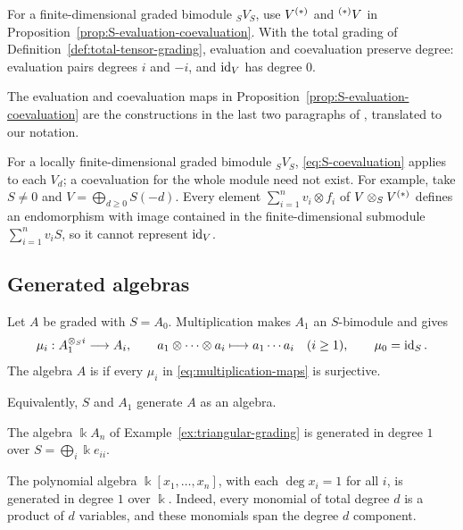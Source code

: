 \begin{advanced}
For a finite-dimensional graded bimodule $ {}_SV_S$, use $V^{(*)}$ and $ {}^{(*)}V$ in Proposition~\ref{prop:S-evaluation-coevaluation}.
With the total grading of Definition~\ref{def:total-tensor-grading}, evaluation and coevaluation preserve degree: evaluation pairs degrees $i$ and $-i$, and $\operatorname{id}_V$ has degree $0$.

The evaluation and coevaluation maps in Proposition~\ref{prop:S-evaluation-coevaluation} are the constructions in the last two paragraphs of \cite[\S2.7, pp.~484--485]{BGS96}, translated to our notation.

For a locally finite-dimensional graded bimodule $ {}_SV_S$, \eqref{eq:S-coevaluation} applies to each $V_d$; a coevaluation for the whole module need not exist.
For example, take $S\neq0$ and $V=\bigoplus_{d\geq0}S(-d)$.
Every element $\sum_{i=1}^n v_i\otimes f_i$ of $V\otimes_S V^{(*)}$ defines an endomorphism with image contained in the finite-dimensional submodule $\sum_{i=1}^n v_iS$, so it cannot represent $\operatorname{id}_V$.
\end{advanced}


\subsection{Generated algebras}

\begin{definition}
Let $A$ be graded with $S=A_0$.
Multiplication makes $A_1$ an $S$-bimodule and gives
\begin{equation}\label{eq:multiplication-maps}
\mu_i:A_1^{\otimes_S i}\longrightarrow A_i,\qquad
a_1\otimes\cdots\otimes a_i\longmapsto a_1\cdots a_i
\quad(i\geq 1),\qquad \mu_0=\operatorname{id}_S.
\end{equation}
The algebra $A$ is  if every $\mu_i$ in \eqref{eq:multiplication-maps} is surjective.
\end{definition}

Equivalently, $S$ and $A_1$ generate $A$ as an algebra.

\begin{example}
The algebra $\Bbbk A_n$ of Example~\ref{ex:triangular-grading} is generated in degree $1$ over $S=\bigoplus_i\Bbbk e_{ii}$.
\end{example}

\begin{example}\label{ex:polynomial-generators}
The polynomial algebra $\Bbbk[x_1,\ldots,x_n]$, with each $\deg x_i=1$ for all $i$, is generated in degree $1$ over $\Bbbk$.
Indeed, every monomial of total degree $d$ is a product of $d$ variables, and these monomials span the degree $d$ component.
\end{example}


